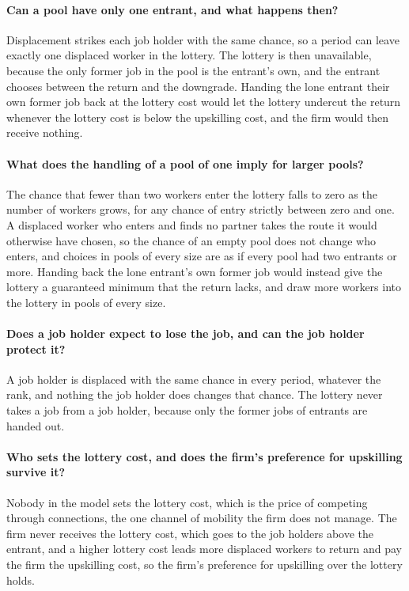 \documentclass[10pt]{article}
\begin{document}
\paragraph{Can a pool have only one entrant, and what happens then?} Displacement strikes each job holder with the same chance, so a period can leave exactly one displaced worker in the lottery. The lottery is then unavailable, because the only former job in the pool is the entrant's own, and the entrant chooses between the return and the downgrade. Handing the lone entrant their own former job back at the lottery cost would let the lottery undercut the return whenever the lottery cost is below the upskilling cost, and the firm would then receive nothing.

\paragraph{What does the handling of a pool of one imply for larger pools?} The chance that fewer than two workers enter the lottery falls to zero as the number of workers grows, for any chance of entry strictly between zero and one. A displaced worker who enters and finds no partner takes the route it would otherwise have chosen, so the chance of an empty pool does not change who enters, and choices in pools of every size are as if every pool had two entrants or more. Handing back the lone entrant's own former job would instead give the lottery a guaranteed minimum that the return lacks, and draw more workers into the lottery in pools of every size.

\paragraph{Does a job holder expect to lose the job, and can the job holder protect it?} A job holder is displaced with the same chance in every period, whatever the rank, and nothing the job holder does changes that chance. The lottery never takes a job from a job holder, because only the former jobs of entrants are handed out.

\paragraph{Who sets the lottery cost, and does the firm's preference for upskilling survive it?} Nobody in the model sets the lottery cost, which is the price of competing through connections, the one channel of mobility the firm does not manage. The firm never receives the lottery cost, which goes to the job holders above the entrant, and a higher lottery cost leads more displaced workers to return and pay the firm the upskilling cost, so the firm's preference for upskilling over the lottery holds.
\end{document}

